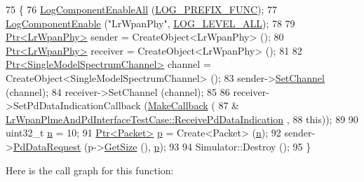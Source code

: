 \begin{DoxyCode}
75 \{
76   \hyperlink{namespacens3_aef610a7dcaaa6c20499283526b538582}{LogComponentEnableAll} (\hyperlink{namespacens3_aa6464a4d69551a9cc968e17a65f39bdba0dd332264f60317e9a365095e80037d1}{LOG\_PREFIX\_FUNC});
77   \hyperlink{namespacens3_adc4ef4f00bb2f5f4edae67fc3bc27f20}{LogComponentEnable} (\textcolor{stringliteral}{"LrWpanPhy"}, \hyperlink{namespacens3_aa6464a4d69551a9cc968e17a65f39bdba022b1237a4fd1b08d034471df3c58586}{LOG\_LEVEL\_ALL});
78 
79   \hyperlink{classns3_1_1Ptr}{Ptr<LrWpanPhy>} sender = CreateObject<LrWpanPhy> ();
80   \hyperlink{classns3_1_1Ptr}{Ptr<LrWpanPhy>} receiver = CreateObject<LrWpanPhy> ();
81 
82   \hyperlink{classns3_1_1Ptr}{Ptr<SingleModelSpectrumChannel>} channel = 
      CreateObject<SingleModelSpectrumChannel> ();
83   sender->\hyperlink{classns3_1_1LrWpanPhy_adc8fc0181c802576d065a6d05f7b29ae}{SetChannel} (channel);
84   receiver->SetChannel (channel);
85 
86   receiver->SetPdDataIndicationCallback (\hyperlink{group__makecallbackmemptr_ga9376283685aa99d204048d6a4b7610a4}{MakeCallback} (
87                                            &
      \hyperlink{classLrWpanPlmeAndPdInterfaceTestCase_ae5a3b982d12af5ca486b561e29e07c40}{LrWpanPlmeAndPdInterfaceTestCase::ReceivePdDataIndication}
      ,
88                                            \textcolor{keyword}{this}));
89 
90   uint32\_t \hyperlink{namespacesample-rng-plot_aeb5ee5c431e338ef39b7ac5431242e1d}{n} = 10;
91   \hyperlink{classns3_1_1Ptr}{Ptr<Packet>} \hyperlink{lte__link__budget_8m_ac9de518908a968428863f829398a4e62}{p} = Create<Packet> (\hyperlink{namespacesample-rng-plot_aeb5ee5c431e338ef39b7ac5431242e1d}{n});
92   sender->\hyperlink{classns3_1_1LrWpanPhy_a44d119b7c56658e97c99d9524e42f48f}{PdDataRequest} (p->\hyperlink{classns3_1_1Packet_a462855c9929954d4301a4edfe55f4f1c}{GetSize} (), \hyperlink{lte__link__budget_8m_ac9de518908a968428863f829398a4e62}{p});
93 
94   Simulator::Destroy ();
95 \}
\end{DoxyCode}


Here is the call graph for this function\+:


